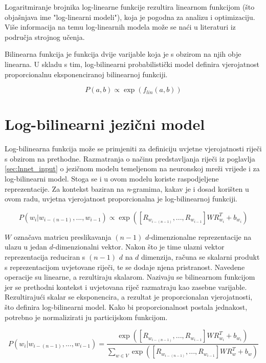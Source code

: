 \documentclass[times, utf8, diplomski, numeric]{fer}
\begin{document}
 Logaritmiranje brojnika log-linearne funkcije rezultira linearnom funkcijom (što objašnjava ime "log-linearni modeli"), koja je pogodna za analizu i optimizaciju. Više informacija na temu log-linearnih modela može se naći u literaturi iz područja strojnog učenja.

Bilinearna funkcija je funkcija dvije varijable koja je s obzirom na njih obje linearna. U skladu s tim, log-bilinearni probabilistički model definira vjerojatnost proporcionalnu eksponenciranoj bilinearnoj funkciji.

\[
P(a, b) \propto \exp(f_{lin}(a, b))
\]

\section{Log-bilinearni jezični model}

Log-bilinearna funkcija može se primjeniti za definiciju uvjetne vjerojatnosti riječi s obzirom na prethodne. Razmatranja o načinu predstavljanja riječi iz poglavlja \ref{sec:lnnet_input} o jezičnom modelu temeljenom na neuronskoj mreži vrijede i za log-bilinearni model. Stoga se i u ovom modelu koriste raspodjeljene reprezentacije. Za kontekst baziran na \textit{n}-gramima, kakav je i dosad korišten u ovom radu, uvjetna vjerojatnost proporcionalna je log-bilinearnoj funkciji.

\begin{equation}
P(w_i | w_{i - (n - 1)}, ... , w_{i - 1}) 
  \propto \exp\left(\left[R_{w_{i - (n - 1)}}, ..., R_{w_{i - 1}}\right] W R_{w_i}^T + b_{w_i}\right)
\end{equation}

$W$ označava matricu preslikavanja $(n - 1)$ $d$-dimenzionalne reprezentacije na ulazu u jedan $d$-dimenzionalni vektor. Nakon što je time ulazni vektor reprezentacija reduciran s $(n - 1)$ $d$ na $d$ dimenzija, računa se skalarni produkt s reprezentacijom uvjetovane riječi, te se dodaje njena pristranost. Navedene operacije su linearne, a rezultiraju skalarom. Nazivaju se bilinearnom funkcijom jer se prethodni kontekst i uvjetovana riječ razmatraju kao zasebne varijable. Rezultirajući skalar se eksponencira, a rezultat je proporcionalan vjerojatnosti, što definira log-bilinearni model. Kako bi proporcionalnost postala jednakost, potrebno je normalizirati ju particijskom funkcijom.

\begin{equation}
\label{eq:p_lbl}
P(w_i | w_{i - (n - 1)}, ... , w_{i - 1}) 
  = \frac{\exp\left(\left[R_{w_{i - (n - 1)}}, ..., R_{w_{i - 1}}\right] W R_{w_i}^T + b_{w_i}\right)}
  {\sum_{w \in V} \exp\left(\left[R_{w_{i - (n - 1)}}, ..., R_{w_{i - 1}}\right] W R_{w}^T + b_{w}\right)}
\end{equation}
\end{document}
